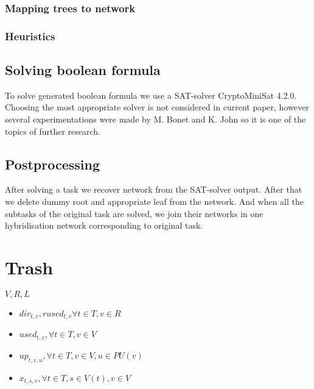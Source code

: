 \documentclass[runningheads, envcountsame, a4paper]{llncs}
\begin{document}
\subsubsection{Mapping trees to network}

\subsubsection{Heuristics}

\subsection{Solving boolean formula}

To solve generated boolean formula we use a SAT-solver CryptoMiniSat 4.2.0. Choosing the most appropriate solver is not considered in current paper, however several experimentations were made by M. Bonet and K. John \cite {Efficiently Calculating Evolutionary Tree Measures Using SAT Maria Luisa Bonet and Katherine St. John} so it is one of the topics of further research.

\subsection{Postprocessing}

After solving a task we recover network from the SAT-solver output. After that we delete dummy root and appropriate leaf from the network. And when all the subtasks of the original task are solved, we join their networks in one hybridisation network corresponding to original task.

\section{Trash}

$V, R, L$

\begin{itemize}

\item $dir_{t,v}, rused_{t,v} \forall t \in T, v \in R$

\item $used_{t,v}, \forall t \in T, v \in V$

\item $up_{t,v,u}, \forall t \in T, v \in V, u \in PU(v)$

\item $x_{t,s,v}, \forall t \in T, s \in V(t), v \in V$
\end{itemize}
\end{document}
